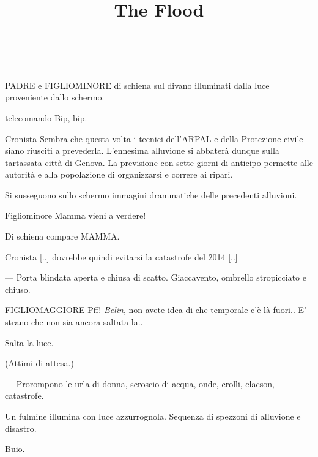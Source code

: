 \documentclass{screenplay}
\title{The Flood}
\author{-}
\begin{document}
\coverpage

\fadein


PADRE e FIGLIOMINORE di schiena sul divano illuminati dalla luce proveniente dallo schermo. 

\begin{dialogue}{telecomando}
Bip, bip.
\end{dialogue}

\begin{dialogue}[in crescendo]{Cronista}
Sembra che questa volta i tecnici dell'ARPAL e della Protezione civile siano riusciti a prevederla. L'ennesima 
alluvione si abbater\`{a} dunque sulla tartassata citt\`{a} di Genova. La previsione con sette giorni di anticipo 
permette alle autorit\`{a} e alla popolazione di organizzarsi e correre ai ripari.
\end{dialogue}

Si susseguono sullo schermo immagini drammatiche delle precedenti alluvioni.

\begin{dialogue}{Figliominore}
Mamma vieni a verdere!
\end{dialogue}

Di schiena compare MAMMA.

\begin{dialogue}{Cronista}
[..] dovrebbe quindi evitarsi la catastrofe del 2014 [..]
\end{dialogue}

\begin{dialogue}{---}
Porta blindata aperta e chiusa di scatto. Giaccavento, ombrello stropicciato e chiuso.
\end{dialogue}

\begin{dialogue}{FIGLIOMAGGIORE}
Pff! \textit{Belin}, non avete idea di che temporale c'\`{e} l\`{a} fuori.. E' strano che non sia ancora saltata la..
\end{dialogue}

Salta la luce.

(Attimi di attesa.)

\begin{dialogue}{---}
Prorompono le urla di donna, scroscio di acqua, onde, crolli, clacson, catastrofe.
\end{dialogue}

Un fulmine illumina con luce azzurrognola. Sequenza di spezzoni di alluvione e disastro.

Buio.
\end{document}
